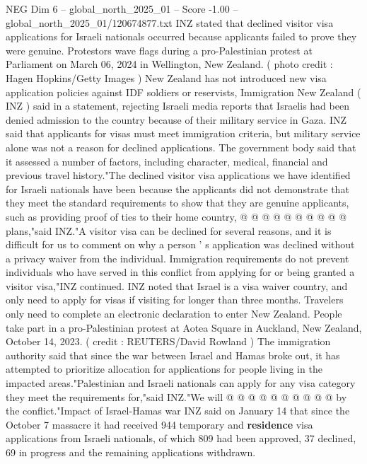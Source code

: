 \begin{textsample}{NEG Dim 6 – global\_north\_2025\_01 – Score -1.00 – global\_north\_2025\_01/120674877.txt}  \label{ex:f6_neg_179}
INZ stated that declined visitor visa applications for Israeli nationals occurred because applicants failed to prove they were genuine.
Protestors wave flags during a pro-Palestinian protest at Parliament on March 06, 2024 in Wellington, New Zealand. ( photo credit : Hagen Hopkins/Getty Images ) New Zealand has not introduced new visa application policies against IDF soldiers or reservists, Immigration New Zealand ( INZ ) said in a statement, rejecting Israeli media reports that Israelis had been denied admission to the country because of their military service in Gaza.
INZ said that applicants for visas must meet immigration criteria, but military service alone was not a reason for declined applications.
The government body said that it assessed a number of factors, including character, medical, financial and previous travel history."The declined visitor visa applications we have identified for Israeli nationals have been because the applicants did not demonstrate that they meet the standard requirements to show that they are genuine applicants, such as providing proof of ties to their home country, @ @ @ @ @ @ @ @ @ @ plans,"said INZ."A visitor visa can be declined for several reasons, and it is difficult for us to comment on why a person ' s application was declined without a privacy waiver from the individual.
Immigration requirements do not prevent individuals who have served in this conflict from applying for or being granted a visitor visa,"INZ continued.
INZ noted that Israel is a visa waiver country, and only need to apply for visas if visiting for longer than three months.
Travelers only need to complete an electronic declaration to enter New Zealand.
People take part in a pro-Palestinian protest at Aotea Square in Auckland, New Zealand, October 14, 2023. ( credit : REUTERS/David Rowland ) The immigration authority said that since the war between Israel and Hamas broke out, it has attempted to prioritize allocation for applications for people living in the impacted areas."Palestinian and Israeli nationals can apply for any visa category they meet the requirements for,"said INZ."We will @ @ @ @ @ @ @ @ @ @ by the conflict."Impact of Israel-Hamas war INZ said on January 14 that since the October 7 massacre it had received 944 temporary and \textbf{residence} visa applications from Israeli nationals, of which 809 had been approved, 37 declined, 69 in progress and the remaining applications withdrawn.

\end{textsample}
